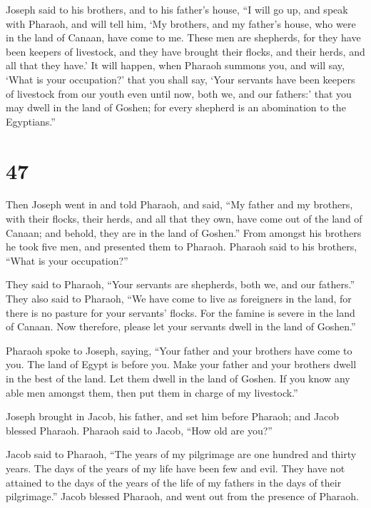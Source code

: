  Joseph said to his brothers, and to his father's house,
``I will go up, and speak with Pharaoh, and will tell him, `My brothers,
and my father's house, who were in the land of Canaan, have come to me.
 These men are shepherds, for they have been keepers of
livestock, and they have brought their flocks, and their herds, and all
that they have.'  It will happen, when Pharaoh summons
you, and will say, `What is your occupation?'  that you
shall say, `Your servants have been keepers of livestock from our youth
even until now, both we, and our fathers:' that you may dwell in the
land of Goshen; for every shepherd is an abomination to the Egyptians.''

\hypertarget{section-46}{%
\section{47}\label{section-46}}

 Then Joseph went in and told Pharaoh, and said, ``My
father and my brothers, with their flocks, their herds, and all that
they own, have come out of the land of Canaan; and behold, they are in
the land of Goshen.''  From amongst his brothers he took
five men, and presented them to Pharaoh.  Pharaoh said to
his brothers, ``What is your occupation?''

They said to Pharaoh, ``Your servants are shepherds, both we, and our
fathers.''  They also said to Pharaoh, ``We have come to
live as foreigners in the land, for there is no pasture for your
servants' flocks. For the famine is severe in the land of Canaan. Now
therefore, please let your servants dwell in the land of Goshen.''

 Pharaoh spoke to Joseph, saying, ``Your father and your
brothers have come to you.  The land of Egypt is before
you. Make your father and your brothers dwell in the best of the land.
Let them dwell in the land of Goshen. If you know any able men amongst
them, then put them in charge of my livestock.''

 Joseph brought in Jacob, his father, and set him before
Pharaoh; and Jacob blessed Pharaoh.  Pharaoh said to
Jacob, ``How old are you?''

 Jacob said to Pharaoh, ``The years of my pilgrimage are
one hundred and thirty years. The days of the years of my life have been
few and evil. They have not attained to the days of the years of the
life of my fathers in the days of their pilgrimage.'' 
Jacob blessed Pharaoh, and went out from the presence of Pharaoh.

